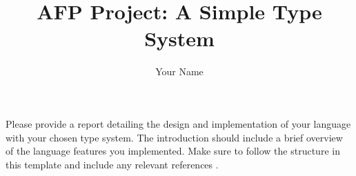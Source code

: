 \documentclass[a4paper]{article}
\title{\textbf{AFP Project:} A Simple Type System}
\author{Your Name}
\begin{document}
\maketitle

Please provide a report detailing the design and implementation of your language with your chosen type system.
The introduction should include a brief overview of the language features you implemented.
Make sure to follow the structure in this template and include any relevant references \cite{klabnik_understanding_2021,weirich_implementing_2023}.





\printbibliography[heading=bibintoc, title={References}]
\end{document}
